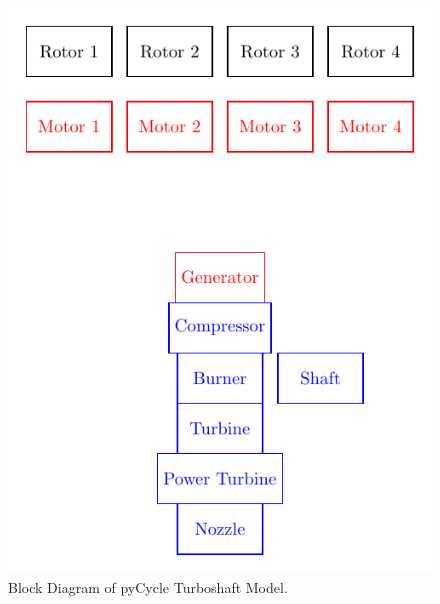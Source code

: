 \begin{figure}
\begin{center}
 \includegraphics[scale=1.0]{../Images/Propulsion_system.pdf}
 \caption{Block Diagram of pyCycle Turboshaft Model.\cite{chapman2018multi}}
 \label{f:turboshaft}
\end{center}
\end{figure}

